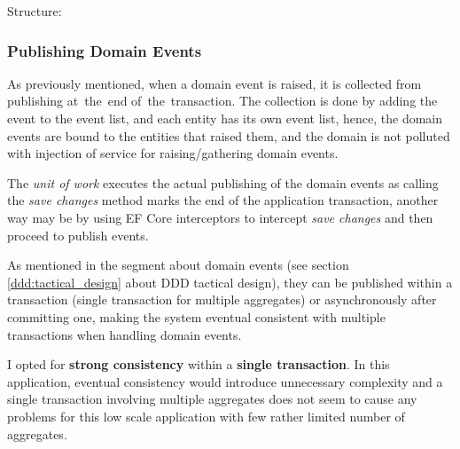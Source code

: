Structure: \vspace{6pt}

\subsubsection{Publishing Domain Events}
As previously mentioned, when a domain event is raised, it is collected from publishing at~the~end of~the~transaction. The collection is done by adding the event to the event list, and each entity has its own event list, hence, the domain events are bound to the entities that raised them, and the domain is not polluted with injection of service for raising/gathering domain events.

The \textit{unit of work} executes the actual publishing of the domain events as calling the \textit{save changes} method marks the end of the application transaction, another way may be by using EF Core interceptors to intercept \textit{save changes} and then proceed to publish events.

As mentioned in the segment about domain events (see section \ref{ddd:tactical_design} about DDD tactical design), they can be published within a transaction (single transaction for multiple aggregates) or asynchronously after committing one, making the system eventual consistent with multiple transactions when handling domain events.

I opted for \textbf{strong consistency} within a \textbf{single transaction}. In this application, eventual consistency would introduce unnecessary complexity and a single transaction involving multiple aggregates does not seem to cause any problems for this low scale application with few rather limited number of aggregates.

